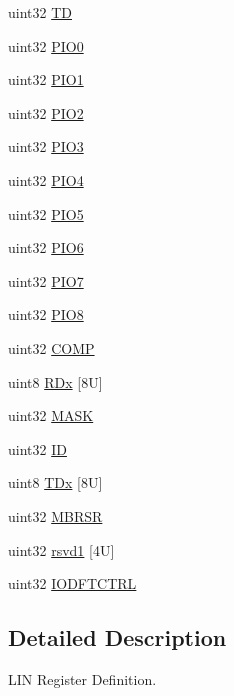 \begin{DoxyCompactItemize}
\item 
uint32 \mbox{\hyperlink{structlinBase_ae0f3e7ace2cb9e080aa482f907647e58}{TD}}
\item 
uint32 \mbox{\hyperlink{structlinBase_a24c4e796301118bb73689b2a5d2df71f}{P\+I\+O0}}
\item 
uint32 \mbox{\hyperlink{structlinBase_aa9b30d4e56ecfaa76956fd5d65cbf822}{P\+I\+O1}}
\item 
uint32 \mbox{\hyperlink{structlinBase_a3b2d40bfcf8c97ab2143e0fbbba8c6cf}{P\+I\+O2}}
\item 
uint32 \mbox{\hyperlink{structlinBase_a8f99320916cab1b4bc7c8f55c6a349c4}{P\+I\+O3}}
\item 
uint32 \mbox{\hyperlink{structlinBase_a222e2dd99a82ee77b23941280cf59b12}{P\+I\+O4}}
\item 
uint32 \mbox{\hyperlink{structlinBase_a633a364e06fc1fe0778a099157b0a1a1}{P\+I\+O5}}
\item 
uint32 \mbox{\hyperlink{structlinBase_a90597761ab9d0d633a76279cba33a95c}{P\+I\+O6}}
\item 
uint32 \mbox{\hyperlink{structlinBase_a6382de661e22732f2594a28dfd67d9b9}{P\+I\+O7}}
\item 
uint32 \mbox{\hyperlink{structlinBase_a65e59ea5e5e6ae71a20c0a0e9477a468}{P\+I\+O8}}
\item 
uint32 \mbox{\hyperlink{structlinBase_a9f7982b210803395788ece985b01ea03}{C\+O\+MP}}
\item 
uint8 \mbox{\hyperlink{structlinBase_a492e7f1568f7758a2eb655c951ae3535}{R\+Dx}} \mbox{[}8\+U\mbox{]}
\item 
uint32 \mbox{\hyperlink{structlinBase_abaa80160140376cc30e04bdf01c3541f}{M\+A\+SK}}
\item 
uint32 \mbox{\hyperlink{structlinBase_afea4820b8b7306cb7afeac41a4adf439}{ID}}
\item 
uint8 \mbox{\hyperlink{structlinBase_a2c4ec84e80aabf2b48d6dda044d04a52}{T\+Dx}} \mbox{[}8\+U\mbox{]}
\item 
uint32 \mbox{\hyperlink{structlinBase_a457acf5cadc80a1de9ceb0f3cbf4278c}{M\+B\+R\+SR}}
\item 
uint32 \mbox{\hyperlink{structlinBase_a925ff0ab5a8b29205ed6a4d64a0f0735}{rsvd1}} \mbox{[}4\+U\mbox{]}
\item 
uint32 \mbox{\hyperlink{structlinBase_a17730d4db36753ac405e9c5fa960972d}{I\+O\+D\+F\+T\+C\+T\+RL}}
\end{DoxyCompactItemize}


\subsection{Detailed Description}
L\+IN Register Definition. 

